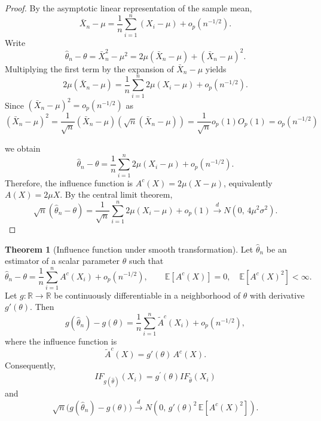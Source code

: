 \documentclass[11pt]{article}
\theoremstyle{definition}
\newtheorem{theo}{Theorem}[section]
\begin{document}
\begin{proof}
By the asymptotic linear representation of the sample mean,
\[
\bar X_n - \mu
=
\frac{1}{n}\sum_{i=1}^n (X_i-\mu) + o_p(n^{-1/2}).
\]
Write
\[
\hat\theta_n - \theta
=
\bar X_n^2 - \mu^2
=
2\mu(\bar X_n - \mu) + (\bar X_n - \mu)^2.
\]
Multiplying the first term by the expansion of $\bar X_n-\mu$ yields
\[
2\mu(\bar X_n - \mu)
=
\frac{1}{n}\sum_{i=1}^n 2\mu(X_i-\mu) + o_p(n^{-1/2}).
\]
Since $(\bar X_n-\mu)^2 = o_p(n^{-1/2})$ as
\[
(\bar X_n-\mu)^2 = \frac{1}{\sqrt{n}}(\bar X_n-\mu)(\sqrt{n}(\bar X_n-\mu)) = \frac{1}{\sqrt{n}}o_p(1)O_p(1) = o_p(n^{-1/2})
\]

we obtain
\[
\hat\theta_n - \theta
=
\frac{1}{n}\sum_{i=1}^n 2\mu(X_i-\mu) + o_p(n^{-1/2}).
\]
Therefore, the influence function is $A^c(X)=2\mu(X-\mu)$, equivalently
$A(X)=2\mu X$.
By the central limit theorem,
\[
\sqrt{n}(\hat\theta_n - \theta)
=
\frac{1}{\sqrt{n}}\sum_{i=1}^n 2\mu(X_i-\mu) + o_p(1)
\xrightarrow{d}
N\!\left(0,\,4\mu^2\sigma^2\right).
\]
\end{proof}
\begin{theo}[Influence function under smooth transformation]
Let $\hat\theta_n$ be an estimator of a scalar parameter $\theta$ such that
\[
\hat\theta_n - \theta
=
\frac{1}{n}\sum_{i=1}^n A^c(X_i) + o_p(n^{-1/2}),
\qquad
\mathbb{E}[A^c(X)] = 0,
\quad
\mathbb{E}[A^c(X)^2] < \infty.
\]
Let $g:\mathbb{R}\to\mathbb{R}$ be continuously differentiable in a neighborhood of $\theta$ with derivative $g'(\theta)$.
Then
\[
g(\hat\theta_n) - g(\theta)
=
\frac{1}{n}\sum_{i=1}^n \tilde A^c(X_i) + o_p(n^{-1/2}),
\]
where the influence function is
\[
\tilde A^c(X)
=
g'(\theta)\, A^c(X).
\]
Consequently,
$$
IF_{g(\hat{\theta})}(X_i) = g^\prime(\theta) IF_{\hat{\theta}}(X_i)
$$
and
\[
\sqrt{n}\big(g(\hat\theta_n) - g(\theta)\big)
\xrightarrow{d}
N\!\left(0,\, g'(\theta)^2 \, \mathbb{E}[A^c(X)^2]\right).
\]
\end{theo}
\end{document}
